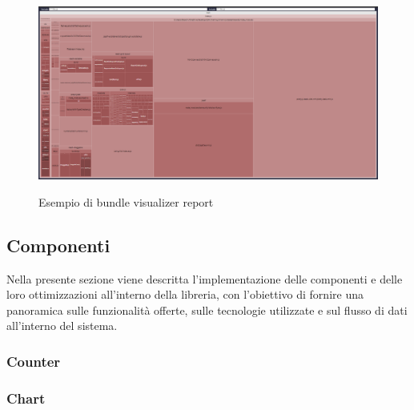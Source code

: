 \begin{figure}[H]
    \centering
    \includegraphics[alt={Esempio di bundle visualizer report}, width=1 \columnwidth]{img/bundle-visualizer.png}
    \caption{Esempio di bundle visualizer report}
    \label{fig:bundle-visualizer}
\end{figure}

\subsection{Componenti}
Nella presente sezione viene descritta l'implementazione delle componenti e delle loro ottimizzazioni all'interno della libreria,
con l'obiettivo di fornire una panoramica sulle funzionalità offerte, sulle tecnologie utilizzate e sul flusso di dati all'interno del sistema.

\subsubsection{Counter}

\subsubsection{Chart}

